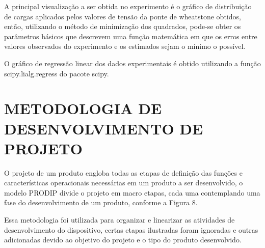 A principal visualização a ser  obtida no experimento é o gráfico de distribuição de cargas aplicados pelos valores de tensão da ponte de wheatstone obtidos, então, utilizando o método de minimização dos quadrados, pode-se obter os parâmetros básicos que descrevem uma função matemática em que os erros entre valores observados do experimento e os estimados sejam o mínimo o possível.

O gráfico de regressão linear dos dados experimentais é obtido utilizando a função scipy.lialg.regress do pacote scipy.

\section{METODOLOGIA DE DESENVOLVIMENTO DE PROJETO}

O projeto de um produto engloba todas as etapas de definição das funções e características operacionais necessárias em um produto a ser desenvolvido, o modelo PRODIP divide o projeto em macro etapas, cada uma contemplando uma fase do desenvolvimento de um produto, conforme a Figura 8.

Essa metodologia foi utilizada para organizar e linearizar as atividades de desenvolvimento do dispositivo, certas etapas ilustradas foram ignoradas e outras adicionadas devido ao objetivo do projeto e o tipo do produto desenvolvido.






